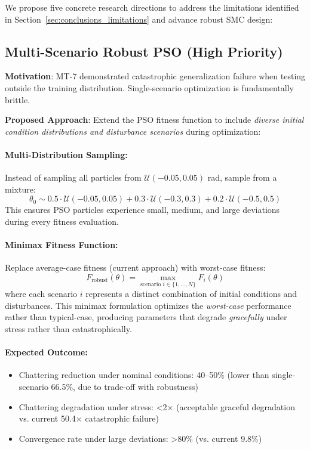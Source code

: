 We propose five concrete research directions to address the limitations identified in Section~\ref{sec:conclusions_limitations} and advance robust SMC design:

\subsection{Multi-Scenario Robust PSO (High Priority)}
\label{sec:conclusions_robust_pso}

\textbf{Motivation}: MT-7 demonstrated catastrophic generalization failure when testing outside the training distribution. Single-scenario optimization is fundamentally brittle.

\textbf{Proposed Approach}: Extend the PSO fitness function to include \textit{diverse initial condition distributions and disturbance scenarios} during optimization:

\paragraph{Multi-Distribution Sampling:}
Instead of sampling all particles from $\mathcal{U}(-0.05, 0.05)$ rad, sample from a mixture:
\begin{equation}
    \theta_0 \sim 0.5 \cdot \mathcal{U}(-0.05, 0.05) + 0.3 \cdot \mathcal{U}(-0.3, 0.3) + 0.2 \cdot \mathcal{U}(-0.5, 0.5)
    \label{eq:conclusions_multi_distribution}
\end{equation}
This ensures PSO particles experience small, medium, and large deviations during every fitness evaluation.

\paragraph{Minimax Fitness Function:}
Replace average-case fitness (current approach) with worst-case fitness:
\begin{equation}
    F_{\text{robust}}(\theta) = \max_{\text{scenario } i \in \{1, \dots, N\}} F_i(\theta)
    \label{eq:conclusions_minimax}
\end{equation}
where each scenario $i$ represents a distinct combination of initial conditions and disturbances. This minimax formulation optimizes the \textit{worst-case} performance rather than typical-case, producing parameters that degrade \textit{gracefully} under stress rather than catastrophically.

\paragraph{Expected Outcome:}
\begin{itemize}
    \item Chattering reduction under nominal conditions: 40--50\% (lower than single-scenario 66.5\%, due to trade-off with robustness)
    \item Chattering degradation under stress: <2$\times$ (acceptable graceful degradation vs. current 50.4$\times$ catastrophic failure)
    \item Convergence rate under large deviations: >80\% (vs. current 9.8\%)
\end{itemize}

